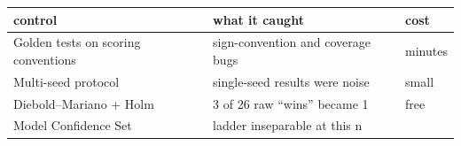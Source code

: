 \begin{longtable}[]{@{}lll@{}}
\toprule
\begin{minipage}[b]{0.30\columnwidth}\raggedright
control\strut
\end{minipage} & \begin{minipage}[b]{0.30\columnwidth}\raggedright
what it caught\strut
\end{minipage} & \begin{minipage}[b]{0.30\columnwidth}\raggedright
cost\strut
\end{minipage}\tabularnewline
\midrule
\endhead
\begin{minipage}[t]{0.30\columnwidth}\raggedright
Golden tests on scoring conventions\strut
\end{minipage} & \begin{minipage}[t]{0.30\columnwidth}\raggedright
sign-convention and coverage bugs\strut
\end{minipage} & \begin{minipage}[t]{0.30\columnwidth}\raggedright
minutes\strut
\end{minipage}\tabularnewline
\begin{minipage}[t]{0.30\columnwidth}\raggedright
Multi-seed protocol\strut
\end{minipage} & \begin{minipage}[t]{0.30\columnwidth}\raggedright
single-seed results were noise\strut
\end{minipage} & \begin{minipage}[t]{0.30\columnwidth}\raggedright
small\strut
\end{minipage}\tabularnewline
\begin{minipage}[t]{0.30\columnwidth}\raggedright
Diebold--Mariano + Holm\strut
\end{minipage} & \begin{minipage}[t]{0.30\columnwidth}\raggedright
3 of 26 raw ``wins'' became 1\strut
\end{minipage} & \begin{minipage}[t]{0.30\columnwidth}\raggedright
free\strut
\end{minipage}\tabularnewline
\begin{minipage}[t]{0.30\columnwidth}\raggedright
Model Confidence Set\strut
\end{minipage} & \begin{minipage}[t]{0.30\columnwidth}\raggedright
ladder inseparable at this n\strut
\end{minipage} & \begin{minipage}[t]{0.30\columnwidth}\raggedright

\end{minipage}
\end{longtable}
